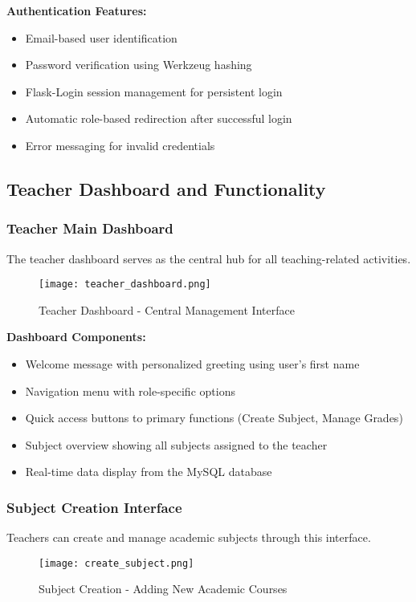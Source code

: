 \documentclass[12pt,a4paper]{article}
\begin{document}
\textbf{Authentication Features:}
\begin{itemize}
    \item Email-based user identification
    \item Password verification using Werkzeug hashing
    \item Flask-Login session management for persistent login
    \item Automatic role-based redirection after successful login
    \item Error messaging for invalid credentials
\end{itemize}

\subsection{Teacher Dashboard and Functionality}

\subsubsection{Teacher Main Dashboard}
The teacher dashboard serves as the central hub for all teaching-related activities.

\begin{figure}[h]
\centering
\texttt{[image: teacher\_dashboard.png]}
\caption{Teacher Dashboard - Central Management Interface}
\label{fig:teacher_dash}
\end{figure}

\textbf{Dashboard Components:}
\begin{itemize}
    \item Welcome message with personalized greeting using user's first name
    \item Navigation menu with role-specific options
    \item Quick access buttons to primary functions (Create Subject, Manage Grades)
    \item Subject overview showing all subjects assigned to the teacher
    \item Real-time data display from the MySQL database
\end{itemize}

\subsubsection{Subject Creation Interface}
Teachers can create and manage academic subjects through this interface.

\begin{figure}[h]
\centering
\texttt{[image: create\_subject.png]}
\caption{Subject Creation - Adding New Academic Courses}
\label{fig:create_subject}
\end{figure}
\end{document}
